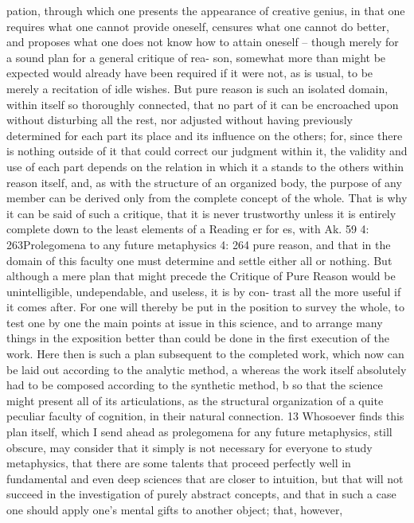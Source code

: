 pation, through which one presents the appearance of creative genius,
in that one requires what one cannot provide oneself, censures what one
cannot do better, and proposes what one does not know how to attain
oneself – though merely for a sound plan for a general critique of rea-
son, somewhat more than might be expected would already have been
required if it were not, as is usual, to be merely a recitation of idle wishes.
But pure reason is such an isolated domain, within itself so thoroughly
connected, that no part of it can be encroached upon without disturbing
all the rest, nor adjusted without having previously determined for each
part its place and its inﬂuence on the others; for, since there is nothing
outside of it that could correct our judgment within it, the validity and
use of each part depends on the relation in which it a stands to the others
within reason itself, and, as with the structure of an organized body, the
purpose of any member can be derived only from the complete concept
of the whole. That is why it can be said of such a critique, that it is never
trustworthy unless it is entirely complete down to the least elements of
a
Reading er for es, with Ak.
59
4: 263Prolegomena to any future metaphysics
4: 264
pure reason, and that in the domain of this faculty one must determine
and settle either all or nothing.
But although a mere plan that might precede the Critique of Pure
Reason would be unintelligible, undependable, and useless, it is by con-
trast all the more useful if it comes after. For one will thereby be put in
the position to survey the whole, to test one by one the main points at
issue in this science, and to arrange many things in the exposition better
than could be done in the ﬁrst execution of the work.
Here then is such a plan subsequent to the completed work, which
now can be laid out according to the analytic method, a whereas the work
itself absolutely had to be composed according to the synthetic method, b
so that the science might present all of its articulations, as the structural
organization of a quite peculiar faculty of cognition, in their natural
connection. 13 Whosoever ﬁnds this plan itself, which I send ahead as
prolegomena for any future metaphysics, still obscure, may consider
that it simply is not necessary for everyone to study metaphysics, that
there are some talents that proceed perfectly well in fundamental and
even deep sciences that are closer to intuition, but that will not succeed
in the investigation of purely abstract concepts, and that in such a case
one should apply one’s mental gifts to another object; that, however,

